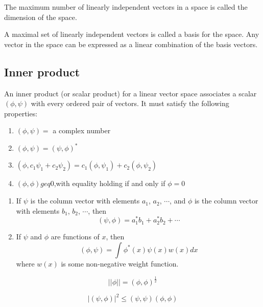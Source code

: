 \documentclass[cyan]{elegantnote}
\begin{document}
\begin{newdef}[Dimension]
The maximum number of linearly independent vectors in a space is called the dimension of the space.
\end{newdef}

\begin{newdef}[Base]
A maximal set of linearly independent vectors is called a basis for the space. Any vector in the space can be expressed as a linear combination of the basis vectors.
\end{newdef}

\subsection{Inner product}
\begin{newdef}
An inner product (or scalar product) for a linear vector space associates a scalar $(\phi,\psi)$ with every ordered pair of vectors. 
It must satisfy the following properties:
\begin{enumerate}
\item $(\phi,\psi) = $ a complex number
\item $(\phi,\psi) = (\psi,\phi)^*$
\item $(\phi,c_1\psi_1 + c_2\psi_2) = c_1(\phi,\psi_1) + c_2(\phi,\psi_2)$
\item $(\phi,\phi) geq 0$,with equality holding if and only if $\phi=0$
\end{enumerate}
\end{newdef}

\begin{example}
\begin{enumerate}
\item If $\psi$ is the column vector with elements $a_1$, $a_2$, $\cdots$, and $\phi$ is the column vector with elements $b_1$, $b_2$, $\cdots$, then
\[(\psi,\phi) = a_1^*b_1 + a_2^*b_2 + \cdots\]
\item If $\psi$ and $\phi$ are functions of $x$, then
\[(\phi,\psi) = \int \phi^*(x) \psi(x) w(x) dx\]
where $w(x)$ is some non-negative weight function.
\end{enumerate}
\end{example}

\begin{newdef}[Norm]
\[|| \phi || = (\phi,\phi)^{\frac{1}{2}}\]
\end{newdef}

\begin{newthem}
\[|(\psi,\phi)|^2 \leq (\psi,\psi)(\phi,\phi)\]
\end{newthem}
\end{document}
